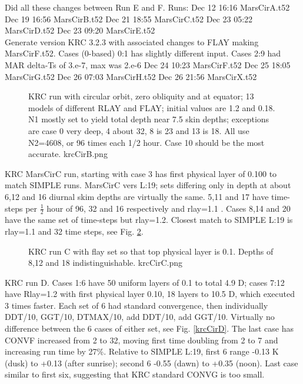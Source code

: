 \documentclass{article}
\begin{document}
Did all these changes between Run E and F. Runs:
 Dec 12 16:16 MarsCirA.t52
 Dec 19 16:56 MarsCirB.t52
 Dec 21 18:55 MarsCirC.t52
 Dec 23 05:22 MarsCirD.t52
 Dec 23 09:20 MarsCirE.t52
\\ Generate version KRC 3.2.3 with associated changes to FLAY making MarsCirF.t52. Cases (0-based) 0:1 has slightly different input. Cases 2:9 had MAR delta-Ts of 3.e-7, max was 2.e-6
 Dec 24 10:23 MarsCirF.t52
 Dec 25 18:05 MarsCirG.t52
 Dec 26 07:03 MarsCirH.t52
 Dec 26 21:56 MarsCirX.t52

\begin{figure}[!ht] 
\caption[KRC RLAY tests]{KRC run with circular orbit, zero obliquity and at
  equator; 13 models of different RLAY and FLAY; initial values are 1.2 and
  0.18. N1 mostly set to yield total depth near 7.5 skin depths; exceptions are
  case 0 very deep, 4 about 32, 8 is 23 and 13 is 18. All use N2=4608, or 96
  times each 1/2 hour. Case 10 should be the most accurate.
\label{krcCirB} krcCirB.png }
\end{figure} 

KRC MarsCirC run, starting with case 3 has first physical layer of 0.100 to
match SIMPLE runs. MarsCirC vers L:19; sets differing only in depth at about 6,12 and 16 diurnal
skim depths are virtually the same. 5,11 and 17 have time-steps per
$\frac{1}{2}$ hour of 96, 32 and 16 respectively and rlay=1.1 . Cases 8,14 and
20 have the same set of time-steps but rlay=1.2.  Closest match to SIMPLE L:19
is rlay=1.1 and 32 time steps, see Fig. \ref{krcCirC}.

\begin{figure}[!ht] 
\caption[KRC flay=.1 tests]{KRC run C with flay set so that top physical layer
  is 0.1. Depths of 8,12 and 18 indistinguishable.
\label{krcCirC} krcCirC.png }
\end{figure} 

KRC run D. Cases 1:6 have 50 uniform layers of 0.1 to total 4.9 D; cases 7:12
have Rlay=1.2 with first physical layer 0.10, 18 layers to 10.5 D, which
executed 3 times faster. Each set of 6 had standard convergence, then
individually DDT/10, GGT/10, DTMAX/10, add DDT/10, add GGT/10. Virtually no
difference between the 6 cases of either set, see Fig. \ref{krcCirD}. The last
case has CONVF increased from 2 to 32, moving first time doubling from 2 to 7
and increasing run time by 27\%. Relative to SIMPLE L:19, first 6 range -0.13 K
(dusk) to +0.13 (after sunrise); second 6 -0.55 (dawn) to +0.35 (noon). Last
case similar to first six, suggesting that KRC standard CONVG is too small.
\end{document}
